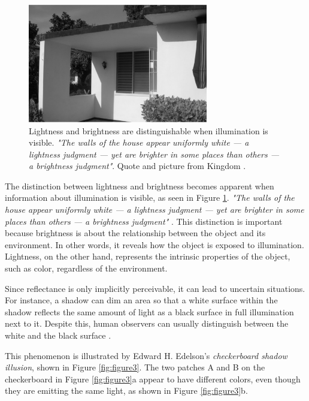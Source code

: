 \begin{figure}[H]
    \centering
    \includegraphics[width=0.7\textwidth]{media/bright_lightness.png}
    \begin{minipage}{0.8\textwidth}
    \caption[Lightness and brightness are distinguishable]{Lightness and brightness are
    distinguishable when illumination is visible. \emph{"The walls of the house appear
    uniformly white — a lightness judgment — yet are brighter in some places than others —
    a brightness judgment"}. Quote and picture from Kingdom \parencite*{Kingdom2014}.}
    \label{fig:figure2}
    \end{minipage}
\end{figure}


The distinction between lightness and brightness becomes apparent when information about
illumination is visible, as seen in Figure \ref*{fig:figure2}. \emph{"The walls of the
house appear uniformly white — a lightness judgment — yet are brighter in some places than
others — a brightness judgment"} \parencite{Kingdom2014}. This distinction is important
because brightness is about the relationship between the object and its environment. In
other words, it reveals how the object is exposed to illumination. Lightness, on the other
hand, represents the intrinsic properties of the object, such as color, regardless of the
environment.

Since reflectance is only implicitly perceivable, it can lead to uncertain situations. For
instance, a shadow can dim an area so that a white surface within the shadow reflects the
same amount of light as a black surface in full illumination next to it. Despite this,
human observers can usually distinguish between the white and the black surface
\parencite{arend1993}. 

This phenomenon is illustrated by Edward H. Edelson's \emph{checkerboard shadow illusion},
shown in Figure \ref*{fig:figure3}. The two patches A and B on the checkerboard in Figure
\ref*{fig:figure3}a appear to have different colors, even though they are emitting the
same light, as shown in Figure \ref*{fig:figure3}b.

